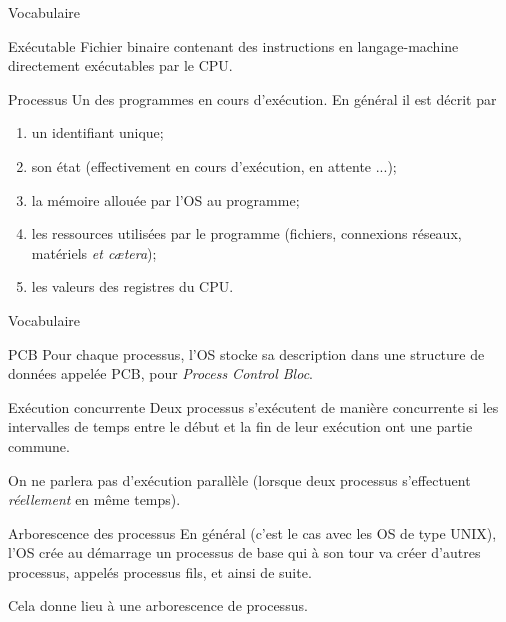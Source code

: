 \documentclass[10pt]{beamer}
\begin{document}
\begin{frame}{Vocabulaire}\pause
\begin{block}{Exécutable}
Fichier binaire contenant des instructions en langage-machine directement exécutables par le CPU.
\end{block}\pause

\begin{block}{Processus}
Un des programmes en cours d'exécution. En général il est décrit par\pause
\begin{enumerate}[--]
	\item un \alert{identifiant} unique;\pause
    \item son \alert{état} (effectivement en cours d'exécution, en attente ...);\pause
    \item la \alert{mémoire} allouée par l'OS au programme;\pause
    \item les \alert{ressources} utilisées par le programme (fichiers, connexions réseaux, matériels \textit{et c\ae tera});\pause
    \item les \alert{valeurs des registres} du CPU.\pause
\end{enumerate}

\end{block}
\end{frame}
\begin{frame}{Vocabulaire}\pause
\begin{block}{PCB}
Pour chaque processus, l'OS stocke sa description dans une structure de données appelée \alert{PCB}, pour \textit{Process Control Bloc}.
\end{block}\pause


\begin{block}{Exécution concurrente}\pause
Deux processus s'exécutent de manière concurrente si les intervalles de temps entre le début et la fin de leur exécution ont une partie commune.
\end{block}\pause
On ne parlera pas d'exécution \alert{parallèle} (lorsque deux processus s'effectuent \textit{réellement} en même temps).
\end{frame}

\begin{frame}{Arborescence des processus}\pause
En général (c'est le cas avec les OS de type \textsc{UNIX}), l'OS crée au démarrage un processus de base qui à son tour va créer d'autres processus, appelés \alert{processus fils}, et ainsi de suite.\\\pause

Cela donne lieu à une \alert{arborescence de processus}.
\end{frame}
\end{document}
